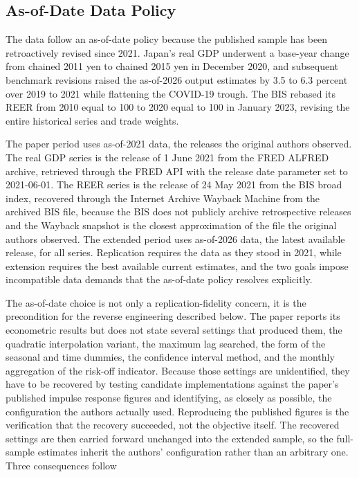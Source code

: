 \subsection{As-of-Date Data Policy}

The data follow an as-of-date policy because the published sample has been retroactively revised since 2021. Japan's real GDP underwent a base-year change from chained 2011 yen to chained 2015 yen in December 2020, and subsequent benchmark revisions raised the as-of-2026 output estimates by 3.5 to 6.3 percent over 2019 to 2021 while flattening the COVID-19 trough. The BIS rebased its REER from 2010 equal to 100 to 2020 equal to 100 in January 2023, revising the entire historical series and trade weights.

The paper period uses as-of-2021 data, the releases the original authors observed. The real GDP series is the release of 1 June 2021 from the FRED ALFRED archive, retrieved through the FRED API with the release date parameter set to 2021-06-01. The REER series is the release of 24 May 2021 from the BIS broad index, recovered through the Internet Archive Wayback Machine from the archived BIS file, because the BIS does not publicly archive retrospective releases and the Wayback snapshot is the closest approximation of the file the original authors observed. The extended period uses as-of-2026 data, the latest available release, for all series. Replication requires the data as they stood in 2021, while extension requires the best available current estimates, and the two goals impose incompatible data demands that the as-of-date policy resolves explicitly.

The as-of-date choice is not only a replication-fidelity concern, it is the precondition for the reverse engineering described below. The paper reports its econometric results but does not state several settings that produced them, the quadratic interpolation variant, the maximum lag searched, the form of the seasonal and time dummies, the confidence interval method, and the monthly aggregation of the risk-off indicator. Because those settings are unidentified, they have to be recovered by testing candidate implementations against the paper's published impulse response figures and identifying, as closely as possible, the configuration the authors actually used. Reproducing the published figures is the verification that the recovery succeeded, not the objective itself. The recovered settings are then carried forward unchanged into the extended sample, so the full-sample estimates inherit the authors' configuration rather than an arbitrary one. Three consequences follow

